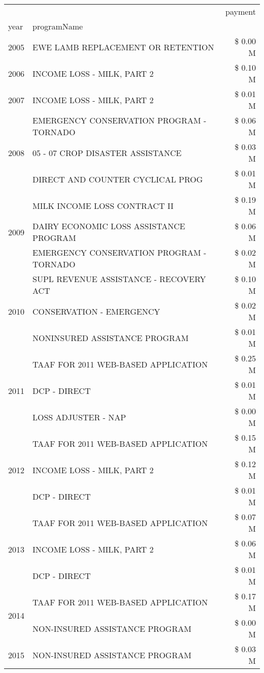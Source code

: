\begin{tabular}{llr}
\toprule
 &  & payment \\
year & programName &  \\
\midrule
2005 & EWE LAMB REPLACEMENT OR RETENTION & \$ 0.00 M \\
\cline{1-3}
2006 & INCOME LOSS - MILK, PART 2 & \$ 0.10 M \\
\cline{1-3}
2007 & INCOME LOSS - MILK, PART 2 & \$ 0.01 M \\
\cline{1-3}
\multirow[t]{3}{*}{2008} & EMERGENCY CONSERVATION PROGRAM - TORNADO & \$ 0.06 M \\
 & 05 - 07 CROP DISASTER ASSISTANCE & \$ 0.03 M \\
 & DIRECT AND COUNTER CYCLICAL PROG & \$ 0.01 M \\
\cline{1-3}
\multirow[t]{3}{*}{2009} & MILK INCOME LOSS CONTRACT II & \$ 0.19 M \\
 & DAIRY ECONOMIC LOSS ASSISTANCE PROGRAM & \$ 0.06 M \\
 & EMERGENCY CONSERVATION PROGRAM - TORNADO & \$ 0.02 M \\
\cline{1-3}
\multirow[t]{3}{*}{2010} & SUPL REVENUE ASSISTANCE - RECOVERY ACT & \$ 0.10 M \\
 & CONSERVATION - EMERGENCY & \$ 0.02 M \\
 & NONINSURED ASSISTANCE PROGRAM & \$ 0.01 M \\
\cline{1-3}
\multirow[t]{3}{*}{2011} & TAAF FOR 2011 WEB-BASED APPLICATION & \$ 0.25 M \\
 & DCP - DIRECT & \$ 0.01 M \\
 & LOSS ADJUSTER - NAP & \$ 0.00 M \\
\cline{1-3}
\multirow[t]{3}{*}{2012} & TAAF FOR 2011 WEB-BASED APPLICATION & \$ 0.15 M \\
 & INCOME LOSS - MILK, PART 2 & \$ 0.12 M \\
 & DCP - DIRECT & \$ 0.01 M \\
\cline{1-3}
\multirow[t]{3}{*}{2013} & TAAF FOR 2011 WEB-BASED APPLICATION & \$ 0.07 M \\
 & INCOME LOSS - MILK, PART 2 & \$ 0.06 M \\
 & DCP - DIRECT & \$ 0.01 M \\
\cline{1-3}
\multirow[t]{2}{*}{2014} & TAAF FOR 2011 WEB-BASED APPLICATION & \$ 0.17 M \\
 & NON-INSURED ASSISTANCE PROGRAM & \$ 0.00 M \\
\cline{1-3}
\multirow[t]{2}{*}{2015} & NON-INSURED ASSISTANCE PROGRAM & \$ 0.03 M \\

\end{tabular}
